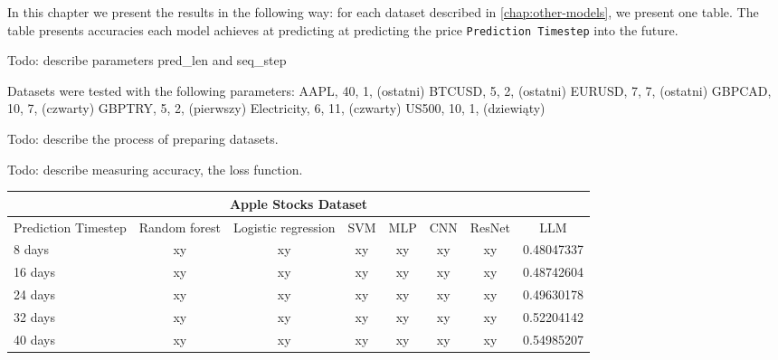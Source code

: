 In this chapter we present the results in the following way: for each dataset described in \autoref{chap:other-models}, we present one table. The table presents accuracies each model achieves at predicting at predicting the price \verb|Prediction Timestep| into the future.

Todo: describe parameters pred_len and seq_step

Datasets were tested with the following parameters:
AAPL, 40, 1, (ostatni)
BTCUSD, 5, 2, (ostatni)
EURUSD, 7, 7, (ostatni)
GBPCAD,  10, 7, (czwarty)
GBPTRY, 5,  2, (pierwszy)
Electricity, 6, 11,  (czwarty)
US500, 10, 1, (dziewiąty)

Todo: describe the process of preparing datasets.

Todo: describe measuring accuracy, the loss function.


\begin{center}
	\begin{tabular}{||l || c | c | c | c | c | c | c||}
		\hline
		\multicolumn{8}{|c|}{Apple Stocks Dataset}                                                        \\
		\hline
		Prediction Timestep & Random forest & Logistic regression & SVM & MLP & CNN & ResNet & LLM        \\ [0.5ex]
		\hline\hline
		8 days              & xy            & xy                  & xy  & xy  & xy  & xy     & 0.48047337 \\
		\hline
		16 days             & xy            & xy                  & xy  & xy  & xy  & xy     & 0.48742604 \\
		\hline
		24 days             & xy            & xy                  & xy  & xy  & xy  & xy     & 0.49630178 \\
		\hline
		32 days             & xy            & xy                  & xy  & xy  & xy  & xy     & 0.52204142 \\
		\hline
		40 days             & xy            & xy                  & xy  & xy  & xy  & xy     & 0.54985207 \\[1ex]

		\hline
	\end{tabular}
\end{center}
